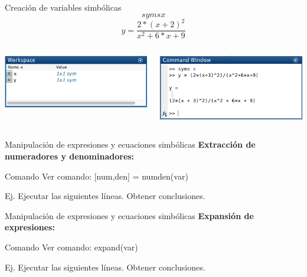 \documentclass{bredelebeamer}
\begin{document}
\begin{frame}{Creación de variables simbólicas}
\begin{equation*}
syms x
\end{equation*}
\begin{equation*}
y = \frac{2*(x+2)^2}{x^2+6*x+9}
\end{equation*}
\begin{columns}
\begin{column}{0.5\textwidth}
\begin{center}
\includegraphics[scale=0.4]{images/fig1.png}
\end{center}
\end{column}
\begin{column}{0.5\textwidth}
\begin{center}
\includegraphics[scale=0.4]{images/fig2.png}
\end{center}
\end{column}
\end{columns}
\end{frame}

\begin{frame}{Manipulación de expresiones y ecuaciones simbólicas}
\textbf{Extracción de numeradores y denominadores:}
\begin{exampleblock}{Comando}
Ver comando: [num,den] = numden(var)
\end{exampleblock}
Ej. Ejecutar las siguientes líneas. Obtener conclusiones.

\end{frame}

\begin{frame}{Manipulación de expresiones y ecuaciones simbólicas}
\textbf{Expansión de expresiones:}
\begin{exampleblock}{Comando}
Ver comando: expand(var)
\end{exampleblock}
Ej. Ejecutar las siguientes líneas. Obtener conclusiones.

\end{frame}
\end{document}
